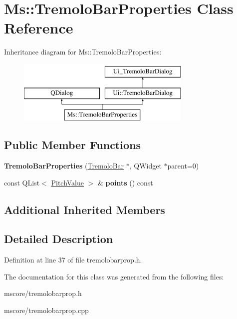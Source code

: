 \hypertarget{class_ms_1_1_tremolo_bar_properties}{}\section{Ms\+:\+:Tremolo\+Bar\+Properties Class Reference}
\label{class_ms_1_1_tremolo_bar_properties}
Inheritance diagram for Ms\+:\+:Tremolo\+Bar\+Properties\+:\begin{figure}[H]
\begin{center}
\leavevmode
\includegraphics[height=3.000000cm]{class_ms_1_1_tremolo_bar_properties}
\end{center}
\end{figure}
\subsection*{Public Member Functions}
\begin{DoxyCompactItemize}
\item 
\mbox{\label{class_ms_1_1_tremolo_bar_properties_aca8c5c36f59b8d449611c0b199fa86ae}} 
{\bfseries Tremolo\+Bar\+Properties} (\hyperlink{class_ms_1_1_tremolo_bar}{Tremolo\+Bar} $\ast$, Q\+Widget $\ast$parent=0)
\item 
\mbox{\label{class_ms_1_1_tremolo_bar_properties_a8649a26c16e65fd2c57cd37e1cf07198}} 
const Q\+List$<$ \hyperlink{struct_ms_1_1_pitch_value}{Pitch\+Value} $>$ \& {\bfseries points} () const
\end{DoxyCompactItemize}
\subsection*{Additional Inherited Members}


\subsection{Detailed Description}


Definition at line 37 of file tremolobarprop.\+h.



The documentation for this class was generated from the following files\+:\begin{DoxyCompactItemize}
\item 
mscore/tremolobarprop.\+h\item 
mscore/tremolobarprop.\+cpp\end{DoxyCompactItemize}
